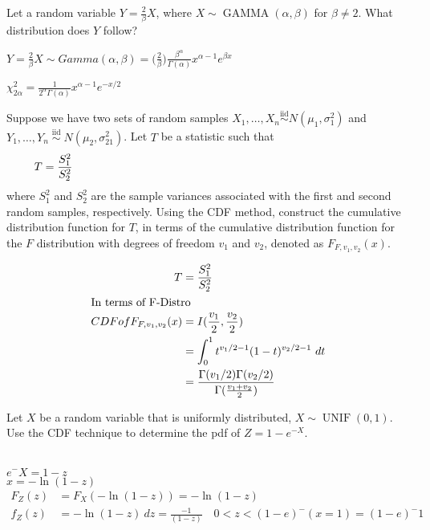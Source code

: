 \documentclass[answers]{exam}
\begin{document}
\begin{questions}
\question 
Let a random variable \(Y=\frac{2}{\beta}X\), where 
\(X \sim \operatorname{GAMMA}(\alpha,\beta)\) for \(\beta\neq2\). 
What distribution does \(Y\) follow?
\begin{solution}
	\(Y=\frac{2}{\beta}X \sim Gamma(\alpha,\beta) = 
	\bigg(\frac{2}{\beta}\bigg)\frac{\beta^\alpha}{\Gamma(\alpha)}x^{\alpha-1}e^{\beta x}\)
	
	\(\chi^2_{2\alpha} = \frac{1}{2^\alpha\Gamma(\alpha)}x^{\alpha-1}e^{-x/2}\)
\end{solution}

\question 
Suppose we have two sets of random samples 
\(X_1,\ldots,X_n \stackrel{\text{iid}}{\sim} N(\mu_1,\sigma_1^2)\) and 
\(Y_1,\ldots,Y_n \stackrel{\text{iid}}{\sim} N(\mu_2,\sigma_21^2)\). 
Let \(T\) be a statistic such that
	\[T = \frac{S_1^2}{S_2^2}  \hspace{0.8\linewidth}\]
where \(S_1^2\) and \(S_2^2\) are the sample variances associated with the first and second random samples, respectively. 
Using the CDF method, construct the cumulative distribution function for \(T\), 
in terms of the cumulative distribution function for the \(F\) distribution 
with degrees of freedom \(v_1\) and \(v_2\), denoted as \(F_{F,v_1,v_2}(x)\).
\begin{solution}
	\begin{align*}
		T &= \frac{S_1^2}{S_2^2} \\
		\intertext{In terms of F-Distro}
		CDF of F_{F,v_1,v_2}(x)
		&= I(\frac{v_1}{2},\frac{v_2}{2}) \\
		&= \int_{0}^{1}t^{v_1/2-1}(1-t)^{v_2/2-1} \ dt \\
		&= \frac{\Gamma(v_1/2)\Gamma(v_2/2)}{\Gamma(\frac{v_1+v_2}{2})}
	\end{align*}
\end{solution}

\question 
Let \(X\) be a random variable that is uniformly distributed, 
\(X\sim\operatorname{UNIF}(0,1)\). 
Use the CDF technique to determine the pdf of \(Z=1-e^{-X}\).
\begin{solution} \\
	\(e^-X=1-z\)\\
	\(x=-\ln(1-z)\) \\
	\begin{align*}
		F_Z(z) &= F_X(-\ln(1-z)) = -\ln(1-z) \\
		f_Z(z) &= -\ln(1-z) \ dz = \frac{-1}{(1-z)}
		\quad 0<z<(1-e)^-(x=1) = (1-e)^-1
	\end{align*}
\end{solution}


\end{questions}
\end{document}
